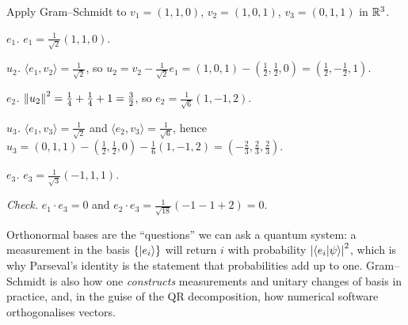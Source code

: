 \begin{example}\label{ex:gs-r3}
  Apply Gram--Schmidt to $v_1=(1,1,0)$, $v_2=(1,0,1)$, $v_3=(0,1,1)$ in $\mathbb{R}^3$.
\end{example}
\begin{solution}
  \begin{steps}
    \item \emph{$e_1$.} $e_1=\frac1{\sqrt2}(1,1,0)$.
    \item \emph{$u_2$.} $\langle e_1,v_2\rangle=\tfrac1{\sqrt2}$, so $u_2=v_2-\tfrac1{\sqrt2}e_1=(1,0,1)-(\tfrac12,\tfrac12,0)=(\tfrac12,-\tfrac12,1)$.
    \item \emph{$e_2$.} $\left\|u_2\right\|^2=\tfrac14+\tfrac14+1=\tfrac32$, so $e_2=\frac1{\sqrt6}(1,-1,2)$.
    \item \emph{$u_3$.} $\langle e_1,v_3\rangle=\tfrac1{\sqrt2}$ and $\langle e_2,v_3\rangle=\tfrac1{\sqrt6}$, hence $u_3=(0,1,1)-(\tfrac12,\tfrac12,0)-\tfrac16(1,-1,2)=(-\tfrac23,\tfrac23,\tfrac23)$.
    \item \emph{$e_3$.} $e_3=\tfrac1{\sqrt3}(-1,1,1)$.
    \item \emph{Check.} $e_1\cdot e_3=0$ and $e_2\cdot e_3=\tfrac1{\sqrt{18}}(-1-1+2)=0$.
  \end{steps}
\end{solution}

\begin{lookahead}
  Orthonormal bases are the ``questions'' we can ask a quantum system: a measurement in the basis $\{\left|e_i\right\rangle\}$ will return $i$ with probability $\left|\left\langle e_i\middle|\psi\right\rangle\right|^2$, which is why Parseval's identity is the statement that probabilities add up to one. Gram--Schmidt is also how one \emph{constructs} measurements and unitary changes of basis in practice, and, in the guise of the QR decomposition, how numerical software orthogonalises vectors.
\end{lookahead}

